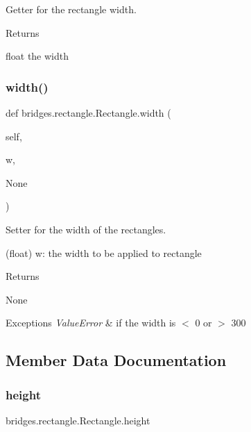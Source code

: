 Getter for the rectangle width. 

\begin{DoxyReturn}{Returns}


float the width 
\end{DoxyReturn}
\mbox{\label{classbridges_1_1rectangle_1_1_rectangle_a6b4b58e7312278fdc5d314bd574096bc}} 
\subsubsection{\texorpdfstring{width()}{width()}\hspace{0.1cm}{\footnotesize\ttfamily [2/2]}}
{\footnotesize\ttfamily def bridges.\+rectangle.\+Rectangle.\+width (\begin{DoxyParamCaption}\item[{}]{self,  }\item[{}]{w,  }\item[{}]{None }\end{DoxyParamCaption})}



Setter for the width of the rectangles. 

(float) w\+: the width to be applied to rectangle \begin{DoxyReturn}{Returns}


None
\end{DoxyReturn}

\begin{DoxyExceptions}{Exceptions}
{\em Value\+Error} & if the width is $<$ 0 or $>$ 300 \\
\hline
\end{DoxyExceptions}


\subsection{Member Data Documentation}
\mbox{\label{classbridges_1_1rectangle_1_1_rectangle_a3b7a2448881d5eea95e86aac8dfae467}} 
\subsubsection{\texorpdfstring{height}{height}}
{\footnotesize\ttfamily bridges.\+rectangle.\+Rectangle.\+height}

